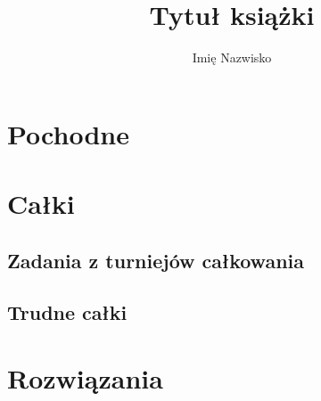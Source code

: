 \documentclass[9pt, twoside, a5paper]{extbook}
\author{Imię Nazwisko}
\title{Tytuł książki}
\theoremstyle{remark}
\begin{document}






\raggedbottom

\chapter{Pochodne}


\chapter{Całki}





	

\section{Zadania z turniejów całkowania}
	



\section{Trudne całki}
	
	
	

\chapter{Rozwiązania}
% 

% 
% 
% 

\end{document}
